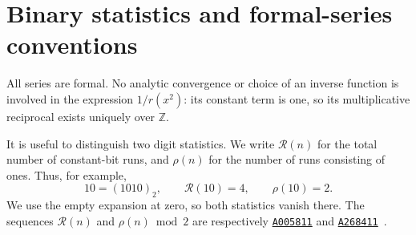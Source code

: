 \documentclass[11pt,a4paper]{article}
\numberwithin{equation}{section}
\theoremstyle{definition}
\theoremstyle{remark}
\newcommand{\Z}{\mathbb Z}
\newcommand{\Runs}{\mathcal R}
\newcommand{\Ones}{\rho}
\newcommand{\oeis}[1]{\href{https://oeis.org/#1}{\texttt{#1}}}
\begin{document}
\section{Binary statistics and formal-series conventions}\label{sec:digits}

All series are formal. No analytic convergence or choice of an inverse
function is involved in the expression $1/r(x^2)$: its constant term is
one, so its multiplicative reciprocal exists uniquely over $\Z$.

It is useful to distinguish two digit statistics. We write $\Runs(n)$
for the total number of constant-bit runs, and $\Ones(n)$ for the number
of runs consisting of ones. Thus, for example,
\[
 10=(1010)_2,\qquad \Runs(10)=4,\qquad \Ones(10)=2.
\]
We use the empty expansion at zero, so both statistics vanish there.
The sequences $\Runs(n)$ and $\Ones(n)\bmod2$ are respectively
\oeis{A005811} and \oeis{A268411}~\cite{oeisruns,oeisparity}.
\end{document}
